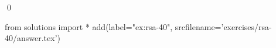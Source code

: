
\begin{ex} 
  \label{ex:rsa-40}
  
  \qed
\end{ex} 
\begin{python0}
from solutions import *
add(label="ex:rsa-40",
    srcfilename='exercises/rsa-40/answer.tex') 
\end{python0}
